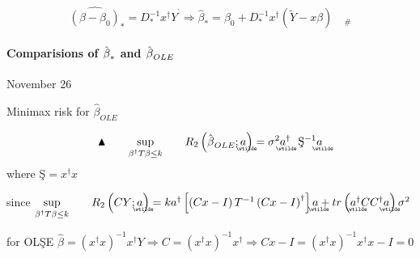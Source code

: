 \documentclass{article}
\begin{document}
\bigskip

\begin{equation*}
\widehat{\left( \beta -\beta _{0}\right) }_{\ast }=D_{\ast }^{-1}x^{\dagger
}Y^{^{\prime }}\Rightarrow \hat{\beta}_{\ast }=\beta _{0}+D_{\ast
}^{-1}x^{\dagger }\left( \tilde{Y}-x\beta \right) \quad _{\#}
\end{equation*}%
\qquad \qquad

\bigskip

\paragraph{Comparisions of $\hat{\protect\beta}_{\ast }$ and $\hat{\protect%
\beta}_{OLE}$}

\quad

November 26

Minimax risk for $\hat{\beta}_{OLE}$

\begin{equation}
\blacktriangle \qquad \underset{\beta ^{\dagger }T\beta \leq k}{\sup }\qquad
R_{2}\left( \hat{\beta}_{OLE};%
\underaccent{\wtilde}{a}%
\right) =\sigma ^{2}%
\underaccent{\wtilde}{a}%
^{\dagger }\text{\c{S}}^{-1}%
\underaccent{\wtilde}{a}%
\end{equation}%
where \c{S}$=x^{\dagger }x$

since $\underset{\beta ^{\dagger }T\beta \leq k}{\sup }\qquad R_{2}\left( CY;%
\underaccent{\wtilde}{a}%
\right) =ka^{\dagger }\left[ \left( Cx-I\right) T^{-1}\left( Cx-I\right)
^{\dagger }\right] 
\underaccent{\wtilde}{a}%
+tr\left( 
\underaccent{\wtilde}{a}%
^{\dagger }CC^{\dagger }%
\underaccent{\wtilde}{a}%
\right) \sigma ^{2}$

for OL\c{S}E $\hat{\beta}=\left( x^{\dagger }x\right) ^{-1}x^{\dagger
}Y\Rightarrow C=\left( x^{\dagger }x\right) ^{-1}x^{\dagger }\Rightarrow
Cx-I=\left( x^{\dagger }x\right) ^{-1}x^{\dagger }x-I=0$
\end{document}
